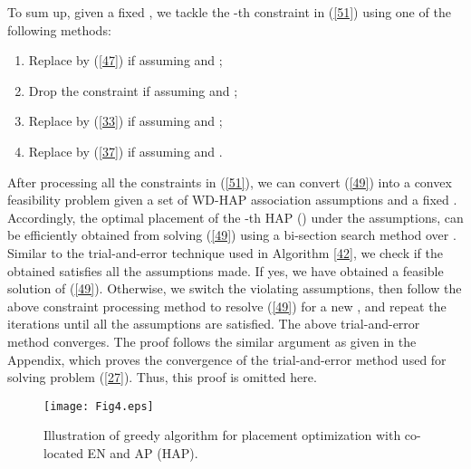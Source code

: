 \documentclass[journal, draftcls, one column, 12pt]{IEEEtran}
\begin{document}
To sum up, given a fixed , we tackle the -th constraint in (\ref{51}) using one of the following methods:
\begin{enumerate}
  \item Replace by (\ref{47}) if assuming  and ;
  \item Drop the constraint if assuming  and ;
  \item Replace by (\ref{33}) if assuming  and ;
  \item Replace by (\ref{37}) if assuming  and .
\end{enumerate}
After processing all the  constraints in (\ref{51}), we can convert (\ref{49}) into a convex feasibility problem given a set of WD-HAP association assumptions and a fixed . Accordingly, the optimal placement of the -th HAP () under the assumptions, can be efficiently obtained from solving (\ref{49}) using a bi-section search method over . Similar to the trial-and-error technique used in Algorithm \ref{42}, we check if the obtained  satisfies all the assumptions made. If yes, we have obtained a feasible solution of (\ref{49}). Otherwise, we switch the violating assumptions, then follow the above constraint processing method to resolve (\ref{49}) for a new , and repeat the iterations until all the assumptions are satisfied. The above trial-and-error method converges. The proof follows the similar argument as given in the Appendix, which proves the convergence of the trial-and-error method used for solving problem (\ref{27}). Thus, this proof is omitted here.


\begin{figure}
\centering
  \begin{center}
    \texttt{[image: Fig4.eps]}
  \end{center}
  \caption{Illustration of greedy algorithm for placement optimization with co-located EN and AP (HAP).}
  \label{66}
\end{figure}
\end{document}

